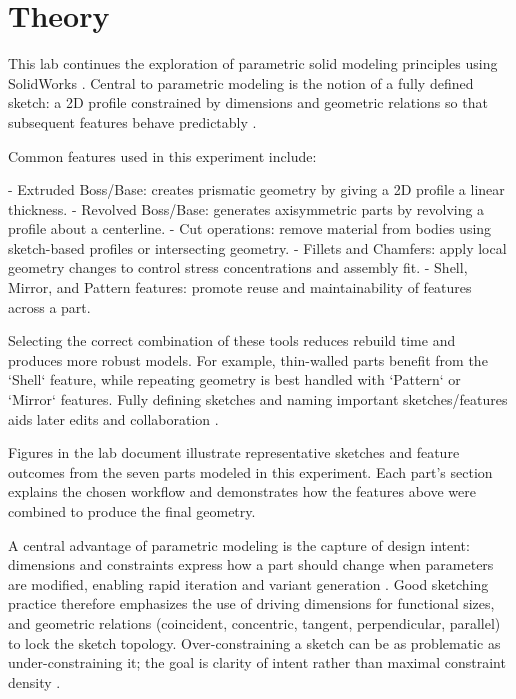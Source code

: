 \section{Theory}

This lab continues the exploration of parametric solid modeling principles using SolidWorks \cite{lab_01_solidworks_bible,lab_01_dassault_official}. Central to parametric modeling is the notion of a fully defined sketch: a 2D profile constrained by dimensions and geometric relations so that subsequent features behave predictably \cite{lab_01_cad_fundamentals}.

Common features used in this experiment include:

- Extruded Boss/Base: creates prismatic geometry by giving a 2D profile a linear thickness.
- Revolved Boss/Base: generates axisymmetric parts by revolving a profile about a centerline.
- Cut operations: remove material from bodies using sketch-based profiles or intersecting geometry.
- Fillets and Chamfers: apply local geometry changes to control stress concentrations and assembly fit.
- Shell, Mirror, and Pattern features: promote reuse and maintainability of features across a part.

Selecting the correct combination of these tools reduces rebuild time and produces more robust models. For example, thin-walled parts benefit from the `Shell` feature, while repeating geometry is best handled with `Pattern` or `Mirror` features. Fully defining sketches and naming important sketches/features aids later edits and collaboration \cite{lab_01_solidworks_bible,lab_01_cad_fundamentals}.

Figures in the lab document illustrate representative sketches and feature outcomes from the seven parts modeled in this experiment. Each part's section explains the chosen workflow and demonstrates how the features above were combined to produce the final geometry.

A central advantage of parametric modeling is the capture of design intent: dimensions and constraints express how a part should change when parameters are modified, enabling rapid iteration and variant generation \cite{lab_01_solidworks_bible}. Good sketching practice therefore emphasizes the use of driving dimensions for functional sizes, and geometric relations (coincident, concentric, tangent, perpendicular, parallel) to lock the sketch topology. Over-constraining a sketch can be as problematic as under-constraining it; the goal is clarity of intent rather than maximal constraint density \cite{lab_01_cad_fundamentals}.

